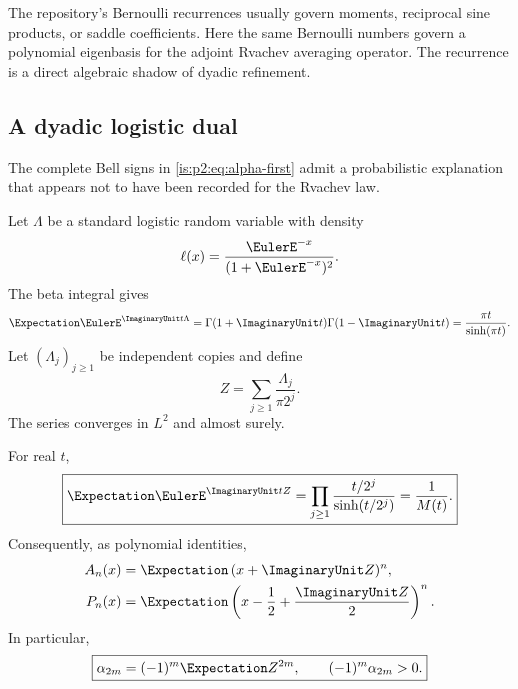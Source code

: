 \begin{remark}
The repository's Bernoulli recurrences usually govern moments, reciprocal sine products, or saddle
coefficients.  Here the same Bernoulli numbers govern a polynomial eigenbasis for the adjoint
Rvachev averaging operator.  The recurrence is a direct algebraic shadow of dyadic refinement.
\end{remark}

\subsection{A dyadic logistic dual}

The complete Bell signs in \eqref{is:p2:eq:alpha-first} admit a probabilistic explanation that appears not
to have been recorded for the Rvachev law.

Let $\Lambda$ be a standard logistic random variable with density
\begin{equation}
 \ell(x)=\frac{\EulerE^{-x}}{(1+\EulerE^{-x})^2}.
 \label{is:p2:eq:logistic-density}
\end{equation}
The beta integral gives
\begin{equation}
 \Expectation\EulerE^{\ImaginaryUnit t\Lambda}
 =\Gamma(1+\ImaginaryUnit t)\Gamma(1-\ImaginaryUnit t)
 =\frac{\pi t}{\sinh(\pi t)}.
 \label{is:p2:eq:logistic-cf}
\end{equation}
Let $(\Lambda_j)_{j\ge1}$ be independent copies and define
\begin{equation}
 Z=\sum_{j\ge1}\frac{\Lambda_j}{\pi2^j}.
 \label{is:p2:eq:Z-logistic}
\end{equation}
The series converges in $L^2$ and almost surely.

\begin{theorem}
\label{is:p2:thm:logistic-dual}
For real $t$,
\begin{equation}
 \boxed{
 \Expectation\EulerE^{\ImaginaryUnit tZ}
 =\prod_{j\ge1}\frac{t/2^j}{\sinh(t/2^j)}
 =\frac1{M(t)}.
 }
 \label{is:p2:eq:Z-cf}
\end{equation}
Consequently, as polynomial identities,
\begin{align}
 A_n(x)&=\Expectation\,(x+\ImaginaryUnit Z)^n,
 \label{is:p2:eq:A-logistic-moment}\\
 P_n(x)&=\Expectation\left(x-\frac12+\frac{\ImaginaryUnit Z}{2}\right)^n.
 \label{is:p2:eq:P-logistic-moment}
\end{align}
In particular,
\begin{equation}
 \boxed{
 \alpha_{2m}=(-1)^m\Expectation Z^{2m},
 \qquad (-1)^m\alpha_{2m}>0.
 }
 \label{is:p2:eq:alpha-sign}
\end{equation}
\end{theorem}


